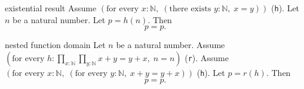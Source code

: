 \begin{cleanresult}{existential result}
Assume $\left(\text{for every }x : \mathbb{N},\; \left(\text{there exists }y : \mathbb{N},\; x = y\right)\right)$ (\texttt{h}).
Let $n$ be a natural number.
Let $p = h(n)$.
Then \[p = p.\]
\end{cleanresult}

\begin{cleanresult}{nested function domain}
Let $n$ be a natural number.
Assume $\left(\text{for every }h : \prod_{x:\mathbb{N}} \prod_{y:\mathbb{N}} x + y = y + x,\; n = n\right)$ (\texttt{r}).
Assume $\left(\text{for every }x : \mathbb{N},\; \left(\text{for every }y : \mathbb{N},\; x + y = y + x\right)\right)$ (\texttt{h}).
Let $p = r(h)$.
Then \[p = p.\]
\end{cleanresult}

